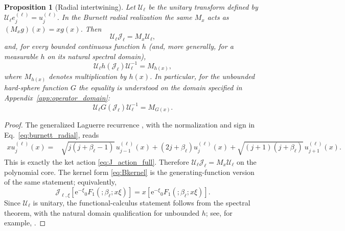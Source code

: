 \documentclass[11pt]{article}
\numberwithin{equation}{section}
\newcommand{\e}{\mathrm e}
\newtheorem{proposition}[theorem]{Proposition}
\theoremstyle{definition}
\begin{document}
\begin{proposition}[Radial intertwining]
Let $\mathcal U_\ell$ be the unitary transform defined by
$\mathcal U_\ell e_j^{(\ell)}=u_j^{(\ell)}$.  In the Burnett radial
realization the same $M_x$ acts as $(M_xg)(x)=xg(x)$.  Then
\begin{equation}
 \mathcal U_\ell\mathcal J_\ell
 =
 M_x\mathcal U_\ell,
 \label{eq:Jintertwine}
\end{equation}
and, for every bounded continuous function $h$ (and, more generally, for a
measurable $h$ on its natural spectral domain),
\begin{equation}
 \mathcal U_\ell h(\mathcal J_\ell)\mathcal U_\ell^{-1}
 =M_{h(x)},
 \label{eq:functional_intertwine}
\end{equation}
where $M_{h(x)}$ denotes multiplication by $h(x)$.  In particular, for the
unbounded hard-sphere function $G$ the equality is understood on the domain
specified in Appendix~\ref{app:operator_domain}:
\begin{equation}
 \mathcal U_\ell G(\mathcal J_\ell)\mathcal U_\ell^{-1}
 =M_{G(x)}.
\end{equation}
\end{proposition}

\begin{proof}
The generalized Laguerre recurrence \cite{Chihara1978,NIST2010}, with the normalization and sign in
Eq.~\eqref{eq:burnett_radial}, reads
\begin{equation}
 \begin{aligned}
 x u_j^{(\ell)}(x)
 ={}&\sqrt{j(j+\beta_\ell-1)}\,u_{j-1}^{(\ell)}(x)
 +(2j+\beta_\ell)u_j^{(\ell)}(x)
 +\sqrt{(j+1)(j+\beta_\ell)}\,u_{j+1}^{(\ell)}(x).
 \end{aligned}
 \label{eq:Laguerre_Jacobi_recurrence}
\end{equation}
This is exactly the ket action \eqref{eq:J_action_full}.  Therefore
$\mathcal U_\ell\mathcal J_\ell=M_x\mathcal U_\ell$ on the polynomial core.
The kernel form \eqref{eq:Bkernel} is the generating-function version of the
same statement; equivalently,
\begin{equation}
 \mathcal J_{\ell,\xi}
 \left[\e^{-\xi}{}_0F_1(;\beta_\ell;x\xi)\right]
 =x\left[\e^{-\xi}{}_0F_1(;\beta_\ell;x\xi)\right].
\end{equation}
Since $\mathcal U_\ell$ is unitary, the functional-calculus statement follows
from the spectral theorem, with the natural domain qualification for
unbounded $h$; see, for example, \cite{ReedSimon1980}.
\end{proof}
\end{document}
